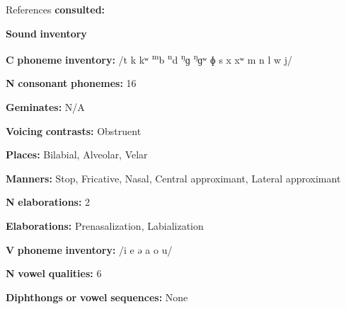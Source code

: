 \documentclass[output=paper]{langsci/langscibook}
\begin{document}
\begin{styleBody}
References \textbf{consulted:} \citet{Loughnane2009}
\end{styleBody}

\begin{styleBody}
\textbf{Sound} \textbf{inventory}
\end{styleBody}

\begin{styleBody}
\textbf{C} \textbf{phoneme} \textbf{inventory:} /t k kʷ \textsuperscript{m}b \textsuperscript{n}d \textsuperscript{ŋ}ɡ \textsuperscript{ŋ}ɡʷ ɸ s x xʷ m n l w j/
\end{styleBody}

\begin{styleBody}
\textbf{N} \textbf{consonant} \textbf{phonemes:} 16
\end{styleBody}

\begin{styleBody}
\textbf{Geminates:} N/A
\end{styleBody}

\begin{styleBody}
\textbf{Voicing} \textbf{contrasts:} Obstruent
\end{styleBody}

\begin{styleBody}
\textbf{Places:} Bilabial, Alveolar, Velar
\end{styleBody}

\begin{styleBody}
\textbf{Manners:} Stop, Fricative, Nasal, Central approximant, Lateral approximant
\end{styleBody}

\begin{styleBody}
\textbf{N} \textbf{elaborations:} 2
\end{styleBody}

\begin{styleBody}
\textbf{Elaborations:} Prenasalization, Labialization
\end{styleBody}

\begin{styleBody}
\textbf{V} \textbf{phoneme} \textbf{inventory:} /i e ə a o u/
\end{styleBody}

\begin{styleBody}
\textbf{N} \textbf{vowel} \textbf{qualities:} 6
\end{styleBody}

\begin{styleBody}
\textbf{Diphthongs} \textbf{or} \textbf{vowel} \textbf{sequences:} None
\end{styleBody}
\end{document}
